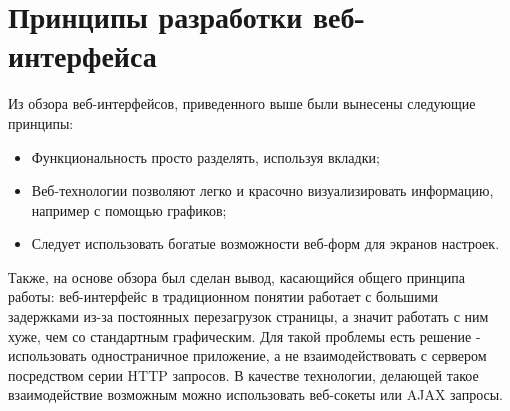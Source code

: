 \section{Принципы разработки веб-интерфейса} \label{sect1_6}

Из обзора веб-интерфейсов, приведенного выше были вынесены следующие принципы:

\begin{itemize}
  \item Функциональность просто разделять, используя вкладки;
  \item Веб-технологии позволяют легко и красочно визуализировать информацию, например с помощью графиков;
  \item Следует использовать богатые возможности веб-форм для экранов настроек.
\end{itemize}

Также, на основе обзора был сделан вывод, касающийся общего принципа работы: веб-интерфейс в традиционном понятии работает с большими задержками из-за постоянных перезагрузок страницы, а значит работать с ним хуже, чем со стандартным графическим. Для такой проблемы есть решение - использовать одностраничное приложение, а не взаимодействовать с сервером посредством серии HTTP запросов. В качестве технологии, делающей такое взаимодействие возможным можно использовать веб-сокеты или AJAX запросы.















